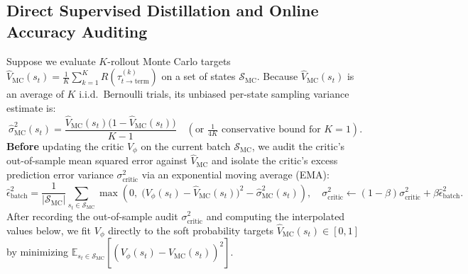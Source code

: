 \documentclass[11pt,a4paper]{article}
\newcommand{\E}{\mathbb{E}}
\newcommand{\Vmc}{\hat{V}_{\text{MC}}}
\begin{document}
\subsection{Direct Supervised Distillation and Online Accuracy Auditing}
Suppose we evaluate $K$-rollout Monte Carlo targets $\Vmc(s_t) = \frac{1}{K}\sum_{k=1}^K R(\tau_{t \to \text{term}}^{(k)})$ on a set of states $\mathcal{S}_{\text{MC}}$. Because $\Vmc(s_t)$ is an average of $K$ i.i.d.\ Bernoulli trials, its unbiased per-state sampling variance estimate is:
\begin{equation}
    \hat{\sigma}^2_{\text{MC}}(s_t) = \frac{\Vmc(s_t)\big(1 - \Vmc(s_t)\big)}{K - 1} \quad (\text{or } \tfrac{1}{4K} \text{ conservative bound for } K = 1).
    \label{eq:sigma_mc}
\end{equation}
\textbf{Before} updating the critic $V_\phi$ on the current batch $\mathcal{S}_{\text{MC}}$, we audit the critic's out-of-sample mean squared error against $\Vmc$ and isolate the critic's excess prediction error variance $\sigma^2_{\text{critic}}$ via an exponential moving average (EMA):
\begin{equation}
    \hat{\epsilon}^2_{\text{batch}} = \frac{1}{|\mathcal{S}_{\text{MC}}|} \sum_{s_t \in \mathcal{S}_{\text{MC}}} \max\!\left(0, \; \big(V_\phi(s_t) - \Vmc(s_t)\big)^2 - \hat{\sigma}^2_{\text{MC}}(s_t)\right), \quad
    \sigma^2_{\text{critic}} \leftarrow (1 - \beta)\sigma^2_{\text{critic}} + \beta \hat{\epsilon}^2_{\text{batch}}.
    \label{eq:sigma_critic}
\end{equation}
After recording the out-of-sample audit $\sigma^2_{\text{critic}}$ and computing the interpolated values below, we fit $V_\phi$ directly to the soft probability targets $\Vmc(s_t) \in [0, 1]$ by minimizing $\E_{s_t \in \mathcal{S}_{\text{MC}}}\!\left[(V_\phi(s_t) - \Vmc(s_t))^2\right]$.
\end{document}

